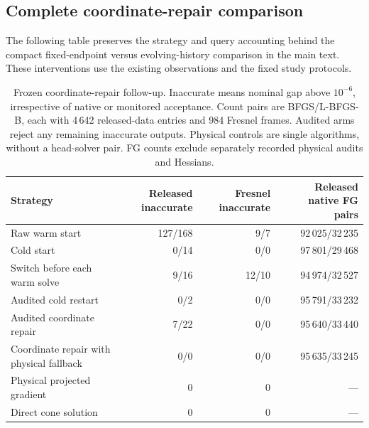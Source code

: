 \documentclass[10pt,a4paper]{article}
\begin{document}
\subsection{Complete coordinate-repair comparison}
The following table preserves the strategy and query accounting behind the compact fixed-endpoint versus evolving-history comparison in the main text. These interventions use the existing observations and the fixed study protocols.
\begin{table}[H]
\caption{Frozen coordinate-repair follow-up. Inaccurate means nominal gap above $10^{-6}$, irrespective of native or monitored acceptance. Count pairs are BFGS/L-BFGS-B, each with 4\,642 released-data entries and 984 Fresnel frames. Audited arms reject any remaining inaccurate outputs. Physical controls are single algorithms, without a head-solver pair. FG counts exclude separately recorded physical audits and Hessians.}
\label{tab:chartrepairdetail}
\centering\small\renewcommand{\arraystretch}{1.12}
\begin{tabularx}{\textwidth}{@{}Xrrr@{}}\toprule
Strategy & Released inaccurate & Fresnel inaccurate & Released native FG pairs\\\midrule
Raw warm start & 127/168 & 9/7 & 92\,025/32\,235\\
Cold start & 0/14 & 0/0 & 97\,801/29\,468\\
Switch before each warm solve & 9/16 & 12/10 & 94\,974/32\,527\\
Audited cold restart & 0/2 & 0/0 & 95\,791/33\,232\\
Audited coordinate repair & 7/22 & 0/0 & 95\,640/33\,440\\
Coordinate repair with physical fallback & 0/0 & 0/0 & 95\,635/33\,245\\
Physical projected gradient & 0 & 0 & ---\\
Direct cone solution & 0 & 0 & ---\\\bottomrule
\end{tabularx}
\end{table}
\FloatBarrier
\end{document}
